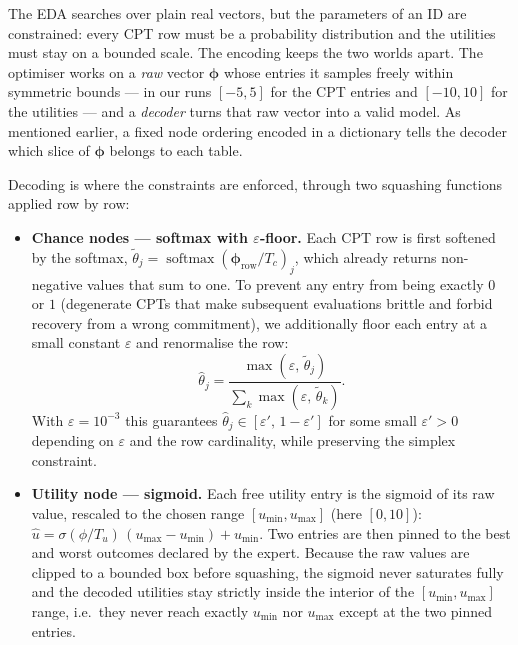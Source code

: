 The EDA searches over plain real vectors, but the parameters of an ID
are constrained: every CPT row must be a probability distribution and
the utilities must stay on a bounded scale. The encoding keeps the two
worlds apart. The optimiser works on a \emph{raw} vector
$\boldsymbol{\phi}$ whose entries it samples freely within symmetric
bounds — in our runs $[-5,5]$ for the CPT entries and $[-10,10]$ for the
utilities — and a \emph{decoder} turns that raw vector into a valid
model. As mentioned earlier, a fixed node ordering encoded in a dictionary tells the decoder which slice of
$\boldsymbol{\phi}$ belongs to each table.

Decoding is where the constraints are enforced, through two squashing
functions applied row by row:

\begin{itemize}
  \item \textbf{Chance nodes --- softmax with $\varepsilon$-floor.}
        Each CPT row is first softened by the softmax,
        $\tilde{\theta}_j = \operatorname{softmax}(\boldsymbol{\phi}_{\text{row}}/T_c)_j$,
        which already returns non-negative values that sum to one. To
        prevent any entry from being exactly $0$ or $1$ (degenerate
        CPTs that make subsequent evaluations brittle and forbid
        recovery from a wrong commitment), we additionally floor each
        entry at a small constant $\varepsilon$ and renormalise the
        row:
        \[
            \hat{\theta}_j = \frac{\max(\varepsilon,\,\tilde{\theta}_j)}
                                  {\sum_k \max(\varepsilon,\,\tilde{\theta}_k)}.
        \]
        With $\varepsilon = 10^{-3}$ this guarantees
        $\hat{\theta}_j \in [\varepsilon',\, 1-\varepsilon']$ for some
        small $\varepsilon'>0$ depending on $\varepsilon$ and the row
        cardinality, while preserving the simplex constraint.
  \item \textbf{Utility node --- sigmoid.} Each free utility entry is the
        sigmoid of its raw value, rescaled to the chosen range
        $[u_{\min},u_{\max}]$ (here $[0,10]$):
        $\hat{u} = \sigma(\phi/T_u)\,(u_{\max}-u_{\min}) + u_{\min}$. Two
        entries are then pinned to the best and worst outcomes declared
        by the expert. Because the raw values are clipped to a bounded
        box before squashing, the sigmoid never saturates fully and the
        decoded utilities stay strictly inside the interior of the
        $[u_{\min},u_{\max}]$ range, i.e.\ they never reach exactly
        $u_{\min}$ nor $u_{\max}$ except at the two pinned entries.
\end{itemize}

